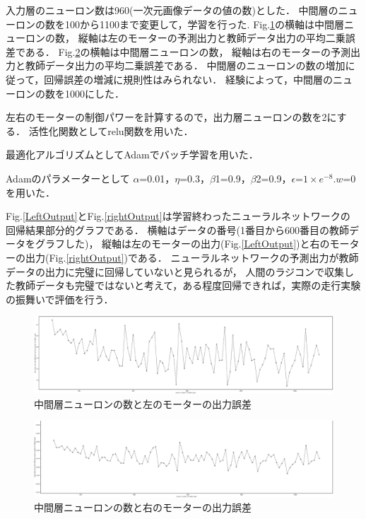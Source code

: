 入力層のニューロン数は960(一次元画像データの値の数)とした．
中間層のニューロンの数を100から1100まで変更して，学習を行った.
Fig.\ref{anti_left}の横軸は中間層ニューロンの数，
縦軸は左のモーターの予測出力と教師データ出力の平均二乗誤差である．
Fig.\ref{anti_right}の横軸は中間層ニューロンの数，
縦軸は右のモーターの予測出力と教師データ出力の平均二乗誤差である．
中間層のニューロンの数の増加に従って，回帰誤差の増減に規則性はみられない．
経験によって，中間層のニューロンの数を1000にした．

左右のモーターの制御パワーを計算するので，出力層ニューロンの数を2にする．
活性化関数としてrelu関数を用いた．

最適化アルゴリズムとしてAdamでバッチ学習を用いた．

Adamのパラメーターとして
$\alpha$=0.01，$\eta$=0.3，$\beta$1=0.9，$\beta$2=0.9，$\epsilon$=$1\times e^{-8}$.$w$=0
を用いた．

Fig.\ref{LeftOutput}とFig.\ref{rightOutput}は学習終わったニューラルネットワークの
回帰結果部分的グラフである．
横軸はデータの番号(1番目から600番目の教師データをグラフした)，
縦軸は左のモーターの出力(Fig.\ref{LeftOutput})と右のモーターの出力(Fig.\ref{rightOutput})である．
ニューラルネットワークの予測出力が教師データの出力に完璧に回帰していないと見られるが，
人間のラジコンで収集した教師データも完璧ではないと考えて，ある程度回帰できれば，実際の走行実験の振舞いで評価を行う．

\vspace{-2mm}
\begin{figure}[h]
        \centering
        \includegraphics[width=1.0\linewidth]{anti_left.eps}
        \caption{中間層ニューロンの数と左のモーターの出力誤差}
        \label{anti_left}
\end{figure}
\vspace{-5mm}
\begin{figure}[h]
        \centering
        \includegraphics[width=1.0\linewidth]{anti_right.eps}
        \caption{中間層ニューロンの数と右のモーターの出力誤差}
        \label{anti_right}
\end{figure}

